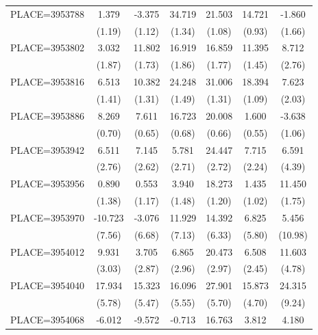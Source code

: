 {\begin{tabular}{l*{6}{c}}
PLACE=3953788       &       1.379&      -3.375&      34.719&      21.503&      14.721&      -1.860\\
                    &      (1.19)&      (1.12)&      (1.34)&      (1.08)&      (0.93)&      (1.66)\\
PLACE=3953802       &       3.032&      11.802&      16.919&      16.859&      11.395&       8.712\\
                    &      (1.87)&      (1.73)&      (1.86)&      (1.77)&      (1.45)&      (2.76)\\
PLACE=3953816       &       6.513&      10.382&      24.248&      31.006&      18.394&       7.623\\
                    &      (1.41)&      (1.31)&      (1.49)&      (1.31)&      (1.09)&      (2.03)\\
PLACE=3953886       &       8.269&       7.611&      16.723&      20.008&       1.600&      -3.638\\
                    &      (0.70)&      (0.65)&      (0.68)&      (0.66)&      (0.55)&      (1.06)\\
PLACE=3953942       &       6.511&       7.145&       5.781&      24.447&       7.715&       6.591\\
                    &      (2.76)&      (2.62)&      (2.71)&      (2.72)&      (2.24)&      (4.39)\\
PLACE=3953956       &       0.890&       0.553&       3.940&      18.273&       1.435&      11.450\\
                    &      (1.38)&      (1.17)&      (1.48)&      (1.20)&      (1.02)&      (1.75)\\
PLACE=3953970       &     -10.723&      -3.076&      11.929&      14.392&       6.825&       5.456\\
                    &      (7.56)&      (6.68)&      (7.13)&      (6.33)&      (5.80)&     (10.98)\\
PLACE=3954012       &       9.931&       3.705&       6.865&      20.473&       6.508&      11.603\\
                    &      (3.03)&      (2.87)&      (2.96)&      (2.97)&      (2.45)&      (4.78)\\
PLACE=3954040       &      17.934&      15.323&      16.096&      27.901&      15.873&      24.315\\
                    &      (5.78)&      (5.47)&      (5.55)&      (5.70)&      (4.70)&      (9.24)\\
PLACE=3954068       &      -6.012&      -9.572&      -0.713&      16.763&       3.812&       4.180\\

\end{tabular}}

